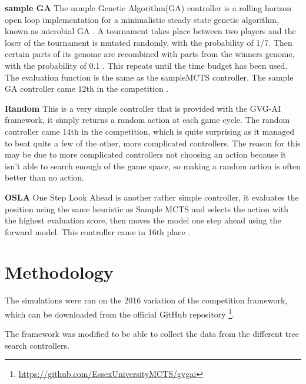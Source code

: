 \documentclass[journal]{IEEEtran}
\begin{document}
		\textbf{sample GA} \label{sssec:sampleGA}
			The sample Genetic Algorithm(GA) controller is a rolling horizon open loop implementation for a minimalistic steady state genetic algorithm, known as microbial GA \cite{harvey2009microbial, perez20162014}.
			A tournament takes place between two players and the loser of the tournament is mutated randomly, with the probability of 1/7. Then certain parts of its genome are recombined with parts from the winners genome, with the probability of 0.1 \cite{perez20162014}. 
			This repeats until the time budget has been used. The evaluation function is the same as the sampleMCTS controller. 
			The sample GA controller came 12th in the competition \cite{perez20162014}.
			

		\textbf{Random}
			This is a very simple controller that is provided with the GVG-AI framework, it simply returns a random action at each game cycle.
			The random controller came 14th in the competition, which is quite surprising as it managed to beat quite a few of the other, more complicated controllers. 
			The reason for this may be due to more complicated controllers not choosing an action because it isn't able to search enough of the game space, so making a random action is often better than no action.

		\textbf{OSLA}
			One Step Look Ahead is another rather simple controller, it evaluates the position using the same heuristic as Sample MCTS and selects the action with the highest evaluation score, then moves the model one step ahead using the forward model. This controller came in 16th place \cite{perez20162014}.

	

	


\section{Methodology}	
	
	The simulations were ran on the 2016 variation of the competition framework, which can be downloaded from the official GitHub repository \footnote{ \url{https://github.com/EssexUniversityMCTS/gvgai}}.
	
	The framework was modified to be able to collect the data from the different tree search controllers.

\end{document}
